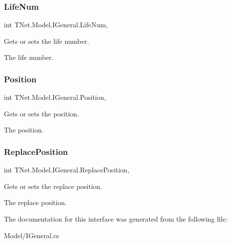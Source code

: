 \subsubsection{\texorpdfstring{Life\+Num}{LifeNum}}
{\footnotesize\ttfamily int T\+Net.\+Model.\+I\+General.\+Life\+Num\hspace{0.3cm}{\ttfamily [get]}, {\ttfamily [set]}}



Gets or sets the life number. 

The life number.\mbox{\label{interface_t_net_1_1_model_1_1_i_general_a8df70d044c0bd095103101acbcfbe662}} 
\subsubsection{\texorpdfstring{Position}{Position}}
{\footnotesize\ttfamily int T\+Net.\+Model.\+I\+General.\+Position\hspace{0.3cm}{\ttfamily [get]}, {\ttfamily [set]}}



Gets or sets the position. 

The position.\mbox{\label{interface_t_net_1_1_model_1_1_i_general_a4739d5eb5c5da0ecbed0365662ea2f5e}} 
\subsubsection{\texorpdfstring{Replace\+Position}{ReplacePosition}}
{\footnotesize\ttfamily int T\+Net.\+Model.\+I\+General.\+Replace\+Position\hspace{0.3cm}{\ttfamily [get]}, {\ttfamily [set]}}



Gets or sets the replace position. 

The replace position.

The documentation for this interface was generated from the following file\+:\begin{DoxyCompactItemize}
\item 
Model/I\+General.\+cs\end{DoxyCompactItemize}
